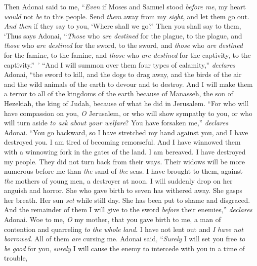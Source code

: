 \begin{biblechapter} %
 Then Adonai said to me, “\textit{Even} if Moses and Samuel stood \textit{before me}, my heart \textit{would} not \textit{be} to this people. Send \textit{them} away from my \textit{sight}, and let them go out.
\verse \textit{And then} if they say to you, ‘Where shall we go?’ Then you shall say to them, ‘Thus says Adonai, “\textit{Those} who \textit{are destined} for the plague, to the plague, 
and \textit{those} who \textit{are destined} for the sword, to the sword, 
and \textit{those} who \textit{are destined} for the famine, to the famine, 
and \textit{those} who \textit{are destined} for the captivity, to the captivity.” ’
\verse “And I will summon over them four types of calamity,” \textit{declares} Adonai, “the sword to kill, and the dogs to drag away, and the birds of the air and the wild animals of the earth to devour and to destroy.
\verse And I will make them a terror to all of the kingdoms of the earth because of Manasseh, the son of Hezekiah, the king of Judah, because of what he did in Jerusalem.
\verse “For who will have compassion on you, \textit{O} Jerusalem, 
or who will show sympathy to you, 
or who will turn aside \textit{to ask about your welfare}?
\verse You have forsaken me,” \textit{declares} Adonai. 
“You go backward, so I have stretched my hand against you, 
and I have destroyed you. 
I am tired of becoming remorseful.
\verse And I have winnowed them with a winnowing fork in the gates of the land. 
I am bereaved. 
I have destroyed my people. 
They did not turn back from their ways.
\verse Their widows will be more numerous before me than \textit{the} sand of \textit{the} seas. 
I have brought to them, against \textit{the} mothers of young men, 
a destroyer at noon. 
I will suddenly drop on her anguish and horror.
\verse She who gave birth to seven has withered away. 
She gasps her breath. 
Her sun \textit{set} while still day. 
She has been put to shame and disgraced. 
And the remainder of them I will give to the sword 
\textit{before} their enemies,” \textit{declares} Adonai.
 Woe to me, \textit{O} my mother, that you gave birth to me, 
a man of contention and quarreling \textit{to the whole land}. 
I have not lent out and \textit{I have not borrowed}. 
All of them \textit{are} cursing me.
\verse Adonai said,
\verse “\textit{Surely} I will set you free \textit{to be good} for you, 
\textit{surely} I will cause the enemy to intercede with you 
in a time of trouble, 

\end{biblechapter}
